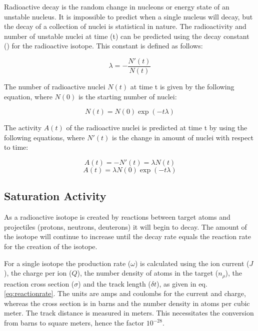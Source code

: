 Radioactive decay is the random change in nucleons or energy state of an unstable nucleus.  It is impossible to predict when a single nucleus will decay, but the decay of a collection of nuclei is statistical in nature.  The radioactivity and number of unstable nuclei at time (t) can be predicted using the decay constant (\textlambda) for the radioactive isotope.  This constant is defined as follows:

\begin{equation}
\lambda = - \frac{N'(t)}{N(t)}
\end{equation}

The number of radioactive nuclei $N(t)$ at time t is given by the following equation, where $N(0)$ is the starting number of nuclei:

\begin{equation}
N(t) = N(0) \exp(-t \lambda)
\end{equation}

The activity $A(t)$ of the radioactive nuclei is predicted at time t by using the following equations, where $N'(t)$ is the change in amount of nuclei with respect to time:

\begin{equation}
A(t) = -N'(t) = \lambda N(t)
\label{eq:activityofanisotope}
\end{equation}
\begin{equation}
A(t) = \lambda N(0) \exp(-t \lambda)
\end{equation}

\subsection{Saturation Activity}

As a radioactive isotope is created by reactions between target atoms and projectiles (protons, neutrons, deuterons) it will begin to decay.  The amount of the isotope will continue to increase until the decay rate equals the reaction rate for the creation of the isotope.

For a single isotope the production rate ($\omega$) is calculated using the ion current ($J$), the charge per ion ($Q$), the number density of atoms in the target ($n_{\rho}$), the reaction cross section ($\sigma$) and the track length ($\delta t$), as given in eq. \ref{eq:reactionrate}.  The units are amps and coulombs for the current and charge, whereas the cross section is in barns and the number density in atoms per cubic meter.  The track distance is measured in meters.  This necessitates the conversion from barns to square meters, hence the factor $10^{-28}$.

